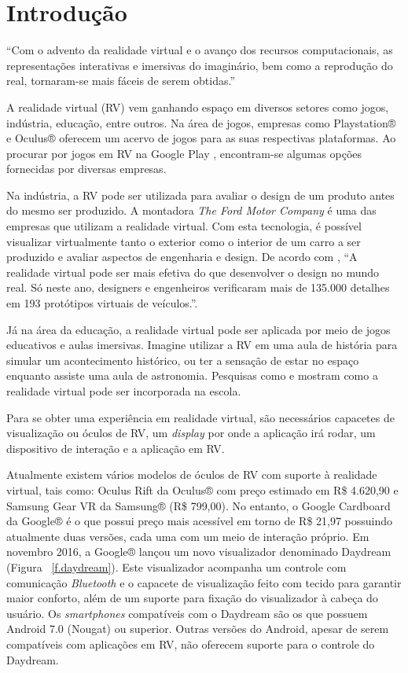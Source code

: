 \chapter{Introdução}
\label{c.introducao}

“Com o advento da realidade virtual e o avanço dos recursos computacionais, as representações interativas e imersivas do imaginário, bem como a reprodução do real, tornaram-se mais fáceis de serem obtidas.” \cite[p. ~9]{torilivro}

A realidade virtual (RV) vem ganhando espaço em diversos setores como jogos, indústria, educação, entre outros. Na área de jogos, empresas como Playstation® e Oculus® oferecem um acervo de jogos para as suas respectivas plataformas. Ao procurar por jogos em RV na Google Play \cite{googleplay}, encontram-se algumas opções fornecidas por diversas empresas.

Na indústria, a RV pode ser utilizada para avaliar o design de um produto antes do mesmo ser produzido. A montadora \textit{The Ford Motor Company} é uma das empresas que utilizam a realidade virtual. Com esta tecnologia, é possível visualizar virtualmente tanto o exterior como o interior de um carro a ser produzido e avaliar aspectos de engenharia e design. De acordo com , “A realidade virtual pode ser mais efetiva do que desenvolver o design no mundo real. Só neste ano, designers e engenheiros verificaram mais de 135.000 detalhes em 193 protótipos virtuais de veículos.”. 

Já na área da educação, a realidade virtual pode ser aplicada por meio de jogos educativos e aulas imersivas. Imagine utilizar a RV em uma aula de história para simular um acontecimento histórico, ou ter a sensação de estar no espaço enquanto assiste uma aula de astronomia. Pesquisas como  e  mostram como a realidade virtual pode ser incorporada na escola.

Para se obter uma experiência em realidade virtual, são necessários capacetes de visualização ou óculos de RV, um \textit{display} por onde a aplicação irá rodar, um dispositivo de interação e a aplicação em RV. 

Atualmente existem vários modelos de óculos de RV com suporte à realidade virtual, tais como: Oculus Rift da Oculus® com preço estimado em R\$ 4.620,90 e Samsung Gear VR da Samsung® (R\$ 799,00). No entanto, o Google Cardboard da Google® é o que possui preço mais acessível em torno de R\$ 21,97 possuindo atualmente duas versões, cada uma com um meio de interação próprio. Em novembro 2016, a Google® lançou um novo visualizador denominado Daydream (Figura ~\ref{f.daydream}). Este visualizador acompanha um controle com comunicação \textit{Bluetooth} e o capacete de visualização feito com tecido para garantir maior conforto, além de um suporte para fixação do visualizador à cabeça do usuário. Os \textit{smartphones} compatíveis com o Daydream são os que possuem Android 7.0 (Nougat) ou superior. Outras versões do Android, apesar de serem compatíveis com aplicações em RV, não oferecem suporte para o controle do Daydream.

